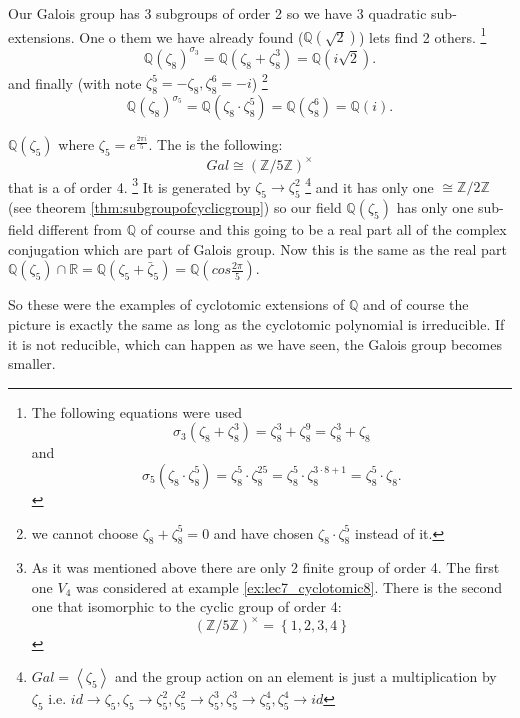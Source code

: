 \begin{example}[$n=8$]
  Our Galois group has 3 subgroups of order 2 so we have 3 quadratic
  sub-extensions. One o them we have already found
  ($\mathbb{Q}\left(\sqrt{2}\right)$) lets find 2 others.
  \footnote{
    The following equations were used
    \[
    \sigma_3\left(\zeta_8 + \zeta_8^3\right) =
    \zeta_8^3 + \zeta_8^9 = \zeta_8^3 + \zeta_8
    \]
    and
    \[
    \sigma_5\left(\zeta_8 \cdot \zeta_8^5\right) =
    \zeta_8^5 \cdot \zeta_8^{25} =
    \zeta_8^5 \cdot \zeta_8^{3 \cdot 8 + 1} =
    \zeta_8^5 \cdot \zeta_8.  
    \]
  }
  \[
  \mathbb{Q}\left(\zeta_8\right)^{\sigma_3} =
  \mathbb{Q}\left(\zeta_8 + \zeta_8^3\right) =
  \mathbb{Q}\left(i \sqrt{2}\right).
  \]
  and finally (with note $\zeta_8^5 = - \zeta_8, \zeta_8^6 = -i$)
  \footnote{
    we cannot choose $\zeta_8 + \zeta_8^5 = 0$ and have chosen
    $\zeta_8 \cdot \zeta_8^5$ instead of it.
  }
  \[
  \mathbb{Q}\left(\zeta_8\right)^{\sigma_5} =
  \mathbb{Q}\left(\zeta_8 \cdot \zeta_8^5\right) =
  \mathbb{Q}\left(\zeta_8^6\right) =
  \mathbb{Q}\left(i\right).
  \]
  \label{ex:lec7_cyclotomic8}
\end{example}

\begin{example}[$n=5$]
  $\mathbb{Q}\left(\zeta_5\right)$ where $\zeta_5 = e^{\frac{2 \pi
      i}{5}}$. The  is the following:
  \[
  Gal \cong \left(\mathbb{Z}/5\mathbb{Z}\right)^\times
  \]
  that is a  of order 4.
  \footnote{
    As it was mentioned above there are only 2 finite group of order
    4. The first one $V_4$ was considered at example
    \ref{ex:lec7_cyclotomic8}. There is the second one that isomorphic
    to the cyclic group of order 4:
    \[
    \left(\mathbb{Z}/5\mathbb{Z}\right)^\times =
    \left\{ 1,2,3,4
    \right\}
    \]
  }
  It is generated by
  $\zeta_5 \to \zeta_5^2$
  \footnote{
    $Gal = \left<\zeta_5\right>$ and the group action on an element is
    just a multiplication by $\zeta_5$ i.e.
    $id \to \zeta_5, \zeta_5 \to \zeta_5^2, \zeta_5^2 \to \zeta_5^3,
    \zeta_5^3 \to \zeta_5^4, \zeta_5^4 \to id$
  }
  and it has only one
   $\cong \mathbb{Z}/2\mathbb{Z}$
  (see theorem \ref{thm:subgroupofcyclicgroup})
  so our
  field $\mathbb{Q}\left(\zeta_5\right)$
  has only one sub-field different from $\mathbb{Q}$ of course and
  this going to be a real part all of the complex conjugation which
  are part of Galois group. Now this is the same as the real part
  \(\mathbb{Q}\left(\zeta_5\right) \cap \mathbb{R} =
  \mathbb{Q}\left(\zeta_5 + \bar{\zeta}_5\right) =
  \mathbb{Q}\left(cos \frac{2 \pi}{5}\right)\).
\end{example}
So these were the examples of cyclotomic extensions of $\mathbb{Q}$
and of course the picture is exactly the same as long as the
cyclotomic polynomial is irreducible. If it is not reducible, which
can happen as we have seen, the Galois group becomes smaller.


